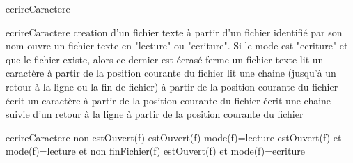 \begin{tad}
	\begin{tadOperations}{ecrireCaractere}
			{\tadUnParam{\chaine}}%
			{}
			{}%
			{}
			{}%
			{}
			{}%
			{\tadUnParam{\booleen}}
			{}%
			{}
			{}%
			{\tadUnParam{\booleen}}
			{}%
			{}
			{}%
			{}
			{}%
			{}
			{}%
			{}
	\end{tadOperations}
	\begin{tadSemantiques}{ecrireCaractere}
			{creation d’un fichier texte à partir d’un fichier identifié par son nom}
			{ouvre un fichier texte en "lecture" ou "ecriture". Si le mode est "ecriture" et que le fichier existe, alors ce dernier est écrasé}
			{ferme un fichier texte}
			{lit un caractère à partir de la position courante du fichier}
			{lit une chaine (jusqu’à un retour à la ligne ou la fin de fichier) à partir de la position courante du fichier}
			{écrit un caractère à partir de la position courante du fichier}
		{écrit une chaine suivie d’un retour à la ligne à partir de la position courante du fichier}
	\end{tadSemantiques}
	
	\begin{tadPreconditions}{ecrireCaractere}
			{non estOuvert(f)}
			{estOuvert(f)}
			{mode(f)=lecture}
			{estOuvert(f) et mode(f)=lecture et non finFichier(f)}
			{estOuvert(f) et mode(f)=ecriture}
	\end{tadPreconditions}
\end{tad}
